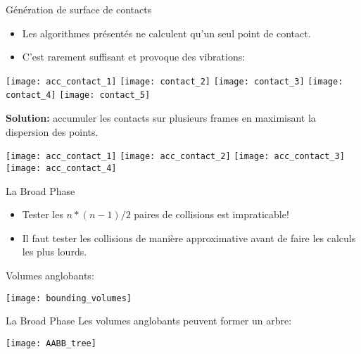 \begin{frame}{Génération de surface de contacts}
    \begin{itemize}
        \item Les algorithmes présentés ne calculent qu’un seul point de contact.
        \item C’est rarement suffisant et provoque des vibrations:
    \end{itemize}
    \begin{center}
        \texttt{[image: acc\_contact\_1]}
        \pause
        \texttt{[image: contact\_2]}
        \pause
        \texttt{[image: contact\_3]}
        \pause
        \texttt{[image: contact\_4]}
        \pause
        \texttt{[image: contact\_5]}
        \pause
    \end{center}

    \textbf{Solution:} accumuler les contacts sur plusieurs frames en maximisant la
    dispersion des points.
    \pause
    \begin{center}
        \texttt{[image: acc\_contact\_1]}
        \pause
        \texttt{[image: acc\_contact\_2]}
        \pause
        \texttt{[image: acc\_contact\_3]}
        \pause
        \texttt{[image: acc\_contact\_4]}
    \end{center}
\end{frame}

\begin{frame}{La Broad Phase}
    \begin{itemize}
        \item Tester les $n * (n - 1) / 2$ paires de collisions est
            impraticable!
        \item Il faut tester les collisions de manière approximative avant de
            faire les calculs les plus lourds.
    \end{itemize}
    \pause
    \begin{description}
        \item[Volumes anglobants:]
    \end{description}
    \begin{center}
        \texttt{[image: bounding\_volumes]}
    \end{center}
\end{frame}

\begin{frame}{La Broad Phase}
    Les volumes anglobants peuvent former un arbre:
    \begin{center}
            \texttt{[image: AABB\_tree]}
    \end{center}
\end{frame}

